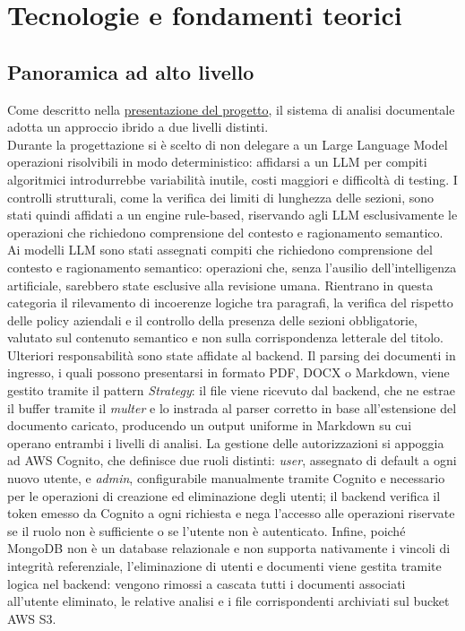 \chapter{Tecnologie e fondamenti teorici}
\label{cap:tecnologie_e_fondamenti_teorici}

\section{Panoramica ad alto livello}
Come descritto nella \hyperref[section:presentazione_progetto]{presentazione del progetto}, il sistema di analisi documentale adotta un approccio ibrido a due livelli distinti.\\

Durante la progettazione si è scelto di non delegare a un Large Language Model operazioni risolvibili in modo deterministico: affidarsi a un LLM per compiti algoritmici introdurrebbe variabilità inutile, costi maggiori e difficoltà di testing. I controlli strutturali, come la verifica dei limiti di lunghezza delle sezioni, sono stati quindi affidati a un engine rule-based, riservando agli LLM esclusivamente le operazioni che richiedono comprensione del contesto e ragionamento semantico.\\

Ai modelli LLM sono stati assegnati compiti che richiedono comprensione del contesto e ragionamento semantico: operazioni che, senza l'ausilio dell'intelligenza artificiale, sarebbero state esclusive alla revisione umana. Rientrano in questa categoria il rilevamento di incoerenze logiche tra paragrafi, la verifica del rispetto delle policy aziendali e il controllo della presenza delle sezioni obbligatorie, valutato sul contenuto semantico e non sulla corrispondenza letterale del titolo.\\

Ulteriori responsabilità sono state affidate al backend. Il parsing dei documenti in ingresso, i quali possono presentarsi in formato PDF, DOCX o Markdown, viene gestito tramite il pattern \emph{Strategy}: il file viene ricevuto dal backend, che ne estrae il buffer tramite il {\emph{\gls{multer}}\glsfirstoccur} e lo instrada al parser corretto in base all'estensione del documento caricato, producendo un output  uniforme in Markdown su cui operano entrambi i livelli di analisi. La gestione delle autorizzazioni si appoggia ad AWS Cognito, che definisce due ruoli distinti: \textit{user}, assegnato di default a ogni nuovo utente, e \textit{admin}, configurabile manualmente tramite Cognito e necessario per le operazioni di creazione ed eliminazione degli utenti; il backend verifica il token emesso da Cognito a ogni richiesta e nega l'accesso alle operazioni riservate se il ruolo non è sufficiente o se l'utente non è autenticato. Infine, poiché MongoDB non è un database relazionale e non supporta nativamente i vincoli di integrità referenziale, l'eliminazione di utenti e documenti viene gestita tramite logica nel backend: vengono rimossi a cascata tutti i documenti associati all'utente eliminato, le relative analisi e i file corrispondenti archiviati sul bucket AWS S3.\\


